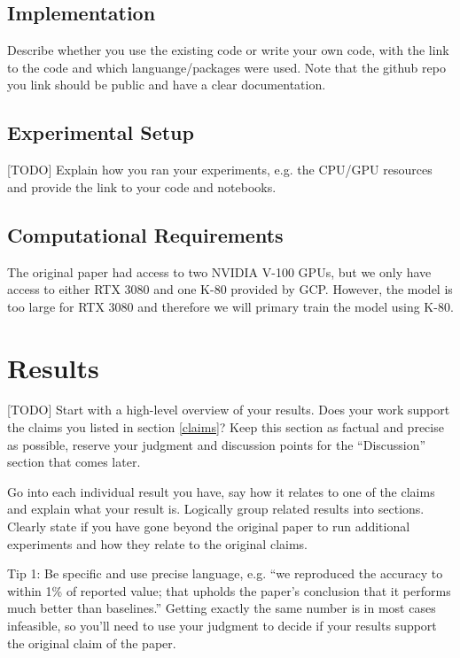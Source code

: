 \documentclass{article}
\begin{document}
\subsection{Implementation}

Describe whether you use the existing code or write your own code, with the link to the code and which languange/packages were used. Note that the github repo you link should be public and have a clear documentation.

\subsection{Experimental Setup}

[TODO] Explain how you ran your experiments, e.g. the CPU/GPU resources and provide the link to your code and notebooks. 

\subsection{Computational Requirements}

The original paper had access to two NVIDIA V-100 GPUs, but we only have access to either 
RTX 3080 and one K-80 provided by GCP. However, the model is too large for RTX 3080 and therefore we will 
primary train the model using K-80.

\section{Results}

[TODO] Start with a high-level overview of your results. Does your work support the claims you listed in section \ref{claims}? Keep this section as factual and precise as possible, reserve your judgment and discussion points for the ``Discussion'' section that comes later. 

Go into each individual result you have, say how it relates to one of the claims and explain what your result is. Logically group related results into sections. Clearly state if you have gone beyond the original paper to run additional experiments and how they relate to the original claims. 

Tip 1: Be specific and use precise language, e.g. ``we reproduced the accuracy to within 1\% of reported value; that upholds the paper's conclusion that it performs much better than baselines.'' Getting exactly the same number is in most cases infeasible, so you'll need to use your judgment to decide if your results support the original claim of the paper. 
\end{document}
